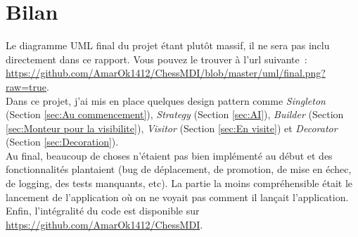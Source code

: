 \documentclass{article}
\begin{document}
	\section{Bilan}
	\label{sec:Bilan}
	Le diagramme UML final du projet étant plutôt massif, il ne sera pas inclu directement dans ce rapport. Vous pouvez le trouver à l'url suivante~: \url{https://github.com/AmarOk1412/ChessMDI/blob/master/uml/final.png?raw=true}.\\
	Dans ce projet, j'ai mis en place quelques design pattern comme \emph{Singleton} (Section \ref{sec:Au commencement}), \emph{Strategy} (Section \ref{sec:AI}), \emph{Builder} (Section \ref{sec:Monteur pour la visibilite}), \emph{Visitor} (Section \ref{sec:En visite}) et \emph{Decorator} (Section \ref{sec:Decoration}).\\
	Au final, beaucoup de choses n'étaient pas bien implémenté au début et des fonctionnalités plantaient (bug de déplacement, de promotion, de mise en échec, de logging, des tests manquants, etc). La partie la moins compréhensible était le lancement de l'application où on ne voyait pas comment il lançait l'application.\\
	Enfin, l'intégralité du code est disponible sur \url{https://github.com/AmarOk1412/ChessMDI}.
\end{document}

